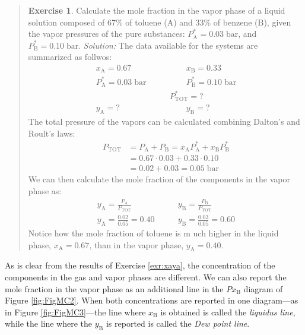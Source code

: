 \documentclass[
  9pt,
]{extbook}
\theoremstyle{definition}
\theoremstyle{definition}
\theoremstyle{definition}
\newtheorem{exercise}{Exercise}[chapter]
\theoremstyle{remark}
\begin{document}
\begin{quote}
\begin{exercise}
\protect\hypertarget{exr:xaya}{}{\label{exr:xaya} }Calculate the mole fraction in the vapor phase of a liquid solution composed of 67\% of toluene (\(\mathrm{A}\)) and 33\% of benzene (\(\mathrm{B}\)), given the vapor pressures of the pure substances: \(P_{\text{A}}^*=0.03\;\text{bar}\), and \(P_{\text{B}}^*=0.10\;\text{bar}\).
\emph{Solution:} The data available for the systems are summarized as follwos:
\begin{equation}
\begin{aligned}
x_{\text{A}}=0.67  \qquad & \qquad x_{\text{B}}=0.33 \\
P_{\text{A}}^* = 0.03\;\text{bar} \qquad & \qquad P_{\text{B}}^* = 0.10\;\text{bar} \\
& P_{\text{TOT}}^* = ? \\
y_{\text{A}}=? \qquad & \qquad y_{\text{B}}=?
\end{aligned}
\label{eq:mc2}
\end{equation}
The total pressure of the vapors can be calculated combining Dalton's and Roult's laws:
\begin{equation}
\begin{aligned}
P_{\text{TOT}} &= P_{\text{A}}+P_{\text{B}}=x_{\text{A}} P_{\text{A}}^* + x_{\text{B}} P_{\text{B}}^* \\
&= 0.67\cdot 0.03+0.33\cdot 0.10 \\
&= 0.02 + 0.03 = 0.05 \;\text{bar}
\end{aligned}
\label{eq:mc3}
\end{equation}
We can then calculate the mole fraction of the components in the vapor phase as:
\begin{equation}
\begin{aligned}
y_{\text{A}}=\frac{P_{\text{A}}}{P_{\text{TOT}}} & \qquad y_{\text{B}}=\frac{P_{\text{B}}}{P_{\text{TOT}}} \\
y_{\text{A}}=\frac{0.02}{0.05}=0.40 & \qquad y_{\text{B}}=\frac{0.03}{0.05}=0.60
\end{aligned}
\label{eq:mc4}
\end{equation}
Notice how the mole fraction of toluene is m uch higher in the liquid phase, \(x_{\text{A}}=0.67\), than in the vapor phase, \(y_{\text{A}}=0.40\).
\end{exercise}
\end{quote}

As is clear from the results of Exercise \ref{exr:xaya}, the concentration of the components in the gas and vapor phases are different. We can also report the mole fraction in the vapor phase as an additional line in the \(Px_{\text{B}}\) diagram of Figure \ref{fig:FigMC2}. When both concentrations are reported in one diagram---as in Figure \ref{fig:FigMC3}---the line where \(x_{\text{B}}\) is obtained is called the \emph{liquidus line}, while the line where the \(y_{\text{B}}\) is reported is called the \emph{Dew point line}.
\end{document}
